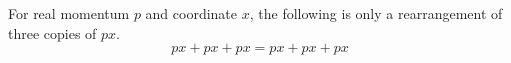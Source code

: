 \documentclass{article}
\newcommand{\px}{px}
\begin{document}
For real momentum $p$ and coordinate $x$, the following is only a
rearrangement of three copies of $p x$.
\begin{equation}
  \px + \px + px = \px + px + px
\end{equation}
\end{document}
